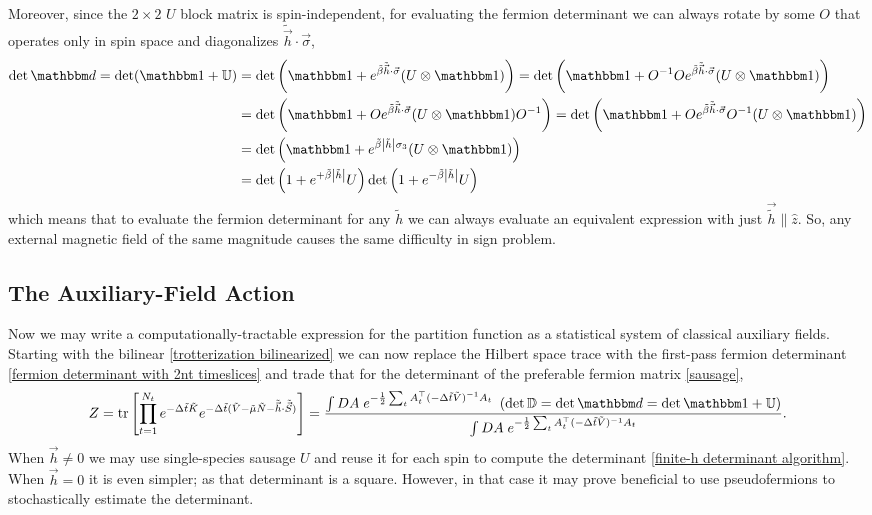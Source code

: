 Moreover, since the $2\times2$ $U$ block matrix is spin-independent, for evaluating the fermion determinant we can always rotate by some $O$ that operates only in spin space and diagonalizes $\tilde{\vec{h}}\cdot\vec{\sigma}$,
\begin{align}
	\det \dd 
	= \det(\one+\UU)
	&= \det\left(\one + e^{\tilde{\beta} \tilde{\vec{h}}\cdot\vec{\sigma}}(U\otimes\one)\right)
	= \det\left(\one + O\inverse O e^{\tilde{\beta} \tilde{\vec{h}}\cdot\vec{\sigma}} (U\otimes\one)\right)
	\nonumber\\
	&= \det\left(\one + O e^{\tilde{\beta} \tilde{\vec{h}}\cdot\vec{\sigma}} (U\otimes\one)O\inverse \right)
	= \det\left(\one + O e^{\tilde{\beta} \tilde{\vec{h}}\cdot\vec{\sigma}} O\inverse (U\otimes\one) \right)
	\nonumber\\
	&= \det\left(\one + e^{\tilde{\beta} \abs{\tilde{h}} \sigma_3 } (U\otimes\one) \right)
	\\
	&= \det\left( 1 + e^{+\tilde{\beta}\abs{\tilde{h}}} U\right)\det\left( 1 + e^{-\tilde{\beta}\abs{\tilde{h}}} U\right)
	\label{eq:finite-h determinant algorithm}
\end{align}
which means that to evaluate the fermion determinant for any $\tilde{h}$ we can always evaluate an equivalent expression with just $\vec{\tilde{h}}\parallel\hat{z}$.
So, any external magnetic field of the same magnitude causes the same difficulty in sign problem.

\subsection{The Auxiliary-Field Action}

Now we may write a computationally-tractable expression for the partition function as a statistical system of classical auxiliary fields.
Starting with the bilinear \eqref{trotterization bilinearized} we can now replace the Hilbert space trace with the first-pass fermion determinant \eqref{fermion determinant with 2nt timeslices} and trade that for the determinant of the preferable fermion matrix \eqref{sausage},
\begin{align}
	Z=\tr{\prod_{t=1}^{N_t} e^{-\Delta \tilde{t}\tilde{K}}  e^{-\Delta \tilde{t}(\tilde{V} - \tilde{\mu}\tilde{N} - \tilde{\vec{h}}\cdot\tilde{\vec{S}})} }
	= 
	\frac{  
		\int DA\; e^{-\frac{1}{2} \sum_t A\transpose_t (-\Delta\tilde{t} \tilde{V})\inverse A_t}
	~	\left(\det \DD = \det \dd = \det \one + \UU \right)
	}{ 
		\int DA\; e^{-\frac{1}{2} \sum_t A\transpose_t (-\Delta\tilde{t} \tilde{V})\inverse A_t}
	}.
	\label{eq:computational partition function}
\end{align}
When $\vec{h}\neq 0$ we may use single-species sausage $U$ and reuse it for each spin to compute the determinant \eqref{finite-h determinant algorithm}.
When $\vec{h} = 0$ it is even simpler; as that determinant is a square.
However, in that case it may prove beneficial to use pseudofermions to stochastically estimate the determinant.

